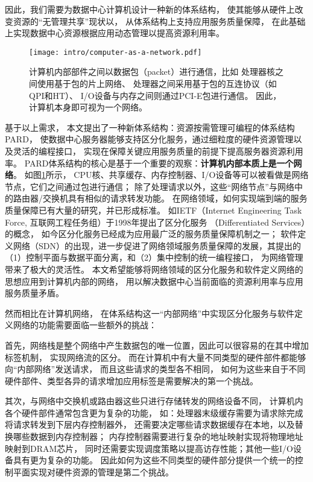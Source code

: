 因此，我们需要为数据中心计算机设计一种新的体系结构，
使其能够从硬件上改变资源的``无管理共享''现状以，
从体系结构上支持应用服务质量保障，
在此基础上实现数据中心资源根据应用动态管理以提高资源利用率。

\begin{figure}[H]
  \centering
  \texttt{[image: intro/computer-as-a-network.pdf]}
  \caption[计算机内部本质是一个网络]{
    计算机内部部件之间以数据包（packet）进行通信，比如
    处理器核之间使用基于包的片上网络、
    处理器之间采用基于包的互连协议（如QPI和HT）、
    I/O设备与内存之间则通过PCI-E包进行通信。
    因此，计算机本身即可视为一个网络。}
  \label{fig:computer-as-a-network}
\end{figure}

基于以上需求，
本文提出了一种新体系结构：资源按需管理可编程的体系结构PARD\cite{pard:2015}，
使数据中心服务器能够支持区分化服务，通过细粒度的硬件资源管理以及灵活的编程接口，
实现在保障关键应用服务质量的前提下提高服务器资源利用率。
PARD体系结构的核心是基于一个重要的观察：\textbf{计算机内部本质上是一个网络}。
如图\ref{fig:computer-as-a-network}所示，
CPU核、共享缓存、内存控制器、I/O设备等可以被看做是网络节点，它们之间通过包进行通信；
除了处理请求以外，这些``网络节点''与网络中的路由器/交换机具有相似的请求转发功能。
在网络领域，如何实现端到端的服务质量保障已有大量的研究，并已形成标准。
如IETF（Internet Engineering Task Force, 互联网工程任务组）于1998年提出了区分化服务
（Differentiated Services）\cite{DiffServ}的概念，
如今区分化服务已经成为应用最广泛的服务质量保障机制之一；
软件定义网络（SDN）\cite{SDN}的出现，进一步促进了网络领域服务质量保障的发展，其提出的
（1）控制平面与数据平面分离，和（2）集中控制的统一编程接口，
为网络管理带来了极大的灵活性。
本文希望能够将网络领域的区分化服务和软件定义网络的思想应用到计算机内部的网络，
用以解决数据中心当前面临的资源利用率与应用服务质量矛盾。

然而相比在计算机网络，
在体系结构这一``内部网络''中实现区分化服务与软件定义网络的功能需要面临一些额外的挑战：

首先，网络栈是整个网络中产生数据包的唯一位置，因此可以很容易的在其中增加标签机制，
实现网络流的区分。
而在计算机中有大量不同类型的硬件部件都能够向``内部网络''发送请求，
而且这些请求的类型各不相同，
如何为这些来自于不同硬件部件、类型各异的请求增加应用标签是需要解决的第一个挑战。

其次，与网络中交换机或路由器这些只进行存储转发的网络设备不同，
计算机内各个硬件部件通常包含更为复杂的功能，
如：处理器末级缓存需要为请求除完成将请求转发到下层内存控制器外，
还需要决定哪些请求数据缓存在本地，以及替换哪些数据到内存控制器；
内存控制器需要进行复杂的地址映射实现将物理地址映射到DRAM芯片，
同时还需要实现调度策略以提高访存性能；其他一些I/O设备具有更为复杂的功能。
因此如何为这些不同类型的硬件部分提供一个统一的控制平面实现对硬件资源的管理是第二个挑战。

